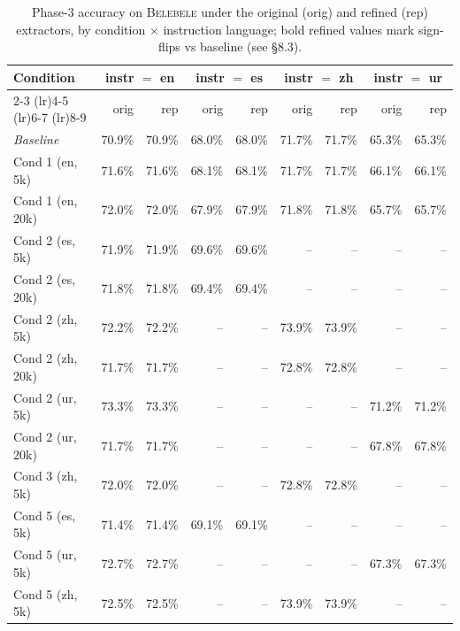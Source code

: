 \begin{table}[t]
  \centering
  \small
  \begin{tabular}{lrrrrrrrr}
    \toprule
    Condition & \multicolumn{2}{c}{instr $=$ en} & \multicolumn{2}{c}{instr $=$ es} & \multicolumn{2}{c}{instr $=$ zh} & \multicolumn{2}{c}{instr $=$ ur} \\
    \cmidrule(lr){2-3} \cmidrule(lr){4-5} \cmidrule(lr){6-7} \cmidrule(lr){8-9}
     & orig & rep & orig & rep & orig & rep & orig & rep \\
    \midrule
    \textit{Baseline} & 70.9\% & 70.9\% & 68.0\% & 68.0\% & 71.7\% & 71.7\% & 65.3\% & 65.3\% \\
    Cond 1 (en, 5k) & 71.6\% & 71.6\% & 68.1\% & 68.1\% & 71.7\% & 71.7\% & 66.1\% & 66.1\% \\
    Cond 1 (en, 20k) & 72.0\% & 72.0\% & 67.9\% & 67.9\% & 71.8\% & 71.8\% & 65.7\% & 65.7\% \\
    Cond 2 (es, 5k) & 71.9\% & 71.9\% & 69.6\% & 69.6\% & -- & -- & -- & -- \\
    Cond 2 (es, 20k) & 71.8\% & 71.8\% & 69.4\% & 69.4\% & -- & -- & -- & -- \\
    Cond 2 (zh, 5k) & 72.2\% & 72.2\% & -- & -- & 73.9\% & 73.9\% & -- & -- \\
    Cond 2 (zh, 20k) & 71.7\% & 71.7\% & -- & -- & 72.8\% & 72.8\% & -- & -- \\
    Cond 2 (ur, 5k) & 73.3\% & 73.3\% & -- & -- & -- & -- & 71.2\% & 71.2\% \\
    Cond 2 (ur, 20k) & 71.7\% & 71.7\% & -- & -- & -- & -- & 67.8\% & 67.8\% \\
    Cond 3 (zh, 5k) & 72.0\% & 72.0\% & -- & -- & 72.8\% & 72.8\% & -- & -- \\
    Cond 5 (es, 5k) & 71.4\% & 71.4\% & 69.1\% & 69.1\% & -- & -- & -- & -- \\
    Cond 5 (ur, 5k) & 72.7\% & 72.7\% & -- & -- & -- & -- & 67.3\% & 67.3\% \\
    Cond 5 (zh, 5k) & 72.5\% & 72.5\% & -- & -- & 73.9\% & 73.9\% & -- & -- \\
    \bottomrule
  \end{tabular}
  \caption{Phase-3 accuracy on \textsc{Belebele} under the original (orig) and refined (rep) extractors, by condition $\times$ instruction language; bold refined values mark sign-flips vs baseline (see \S8.3).}
  \label{tab:t3-belebele}
\end{table}

